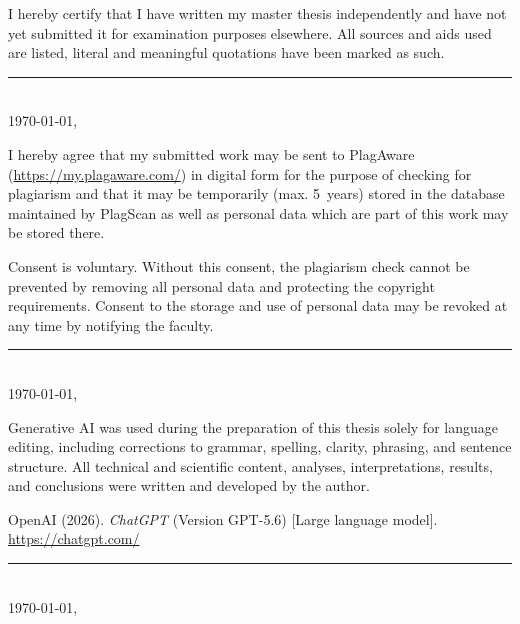 

I hereby certify that I have written my master thesis independently and have not yet submitted it for examination purposes elsewhere.
All sources and aids used are listed, literal and meaningful quotations have been marked as such.

\vspace{40pt}
\begin{flushright}
  \rule{5cm}{0.4pt}\\
  \today, \ShowThesisAuthor    
\end{flushright}


I hereby agree that my submitted work may be sent to PlagAware (\url{https://my.plagaware.com/}) in digital form for the purpose of checking for plagiarism and that it may be temporarily (max. 5~years) stored in the database maintained by PlagScan as well as personal data which are part of this work may be stored there.

\begin{small}
Consent is voluntary.
Without this consent, the plagiarism check cannot be prevented by removing all personal data and protecting the copyright requirements.
Consent to the storage and use of personal data may be revoked at any time by notifying the faculty.
\end{small}

\begin{flushright}
  \rule{5cm}{0.4pt}\\
  \today, \ShowThesisAuthor    
\end{flushright}


Generative AI was used during the preparation of this thesis solely for language editing, including corrections to grammar, spelling, clarity, phrasing, and sentence structure. All technical and scientific content, analyses, interpretations, results, and conclusions were written and developed by the author.

OpenAI (2026). \textit{ChatGPT} (Version GPT-5.6) [Large language model]. \url{https://chatgpt.com/}

\vspace{40pt}
\begin{flushright}
  \rule{5cm}{0.4pt}\\
  \today, \ShowThesisAuthor
\end{flushright}


